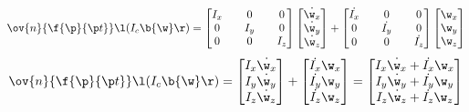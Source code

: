 \documentclass[a4paper, 12pt]{report}
\begin{document}
\begin{center}
$$\ov{n}{\f{\p}{\p t}}\l(I_c \b{\w}\r) = 
\begin{bmatrix}
I_x && 0 && 0 \\
0 && I_y && 0 \\
0 && 0 && I_z
\end{bmatrix}\begin{bmatrix}
\dot{\w_x} \\ \dot{\w_y} \\ \dot{\w_z}
\end{bmatrix}
+ \begin{bmatrix}
\dot{I_x} && 0 && 0 \\
0 && \dot{I_y} && 0 \\
0 && 0 && \dot{I_z}
\end{bmatrix}\begin{bmatrix}
\w_x \\ \w_y \\ \w_z
\end{bmatrix}$$
$$\ov{n}{\f{\p}{\p t}}\l(I_c \b{\w}\r) = 
\begin{bmatrix}
I_x\dot{\w_x} \\
I_y\dot{\w_y} \\
I_z\dot{\w_z}
\end{bmatrix} + \begin{bmatrix}
\dot{I_x}\w_x \\
\dot{I_y}\w_y \\
\dot{I_z}\w_z
\end{bmatrix} = \begin{bmatrix}
I_x\dot{\w_x}+\dot{I_x}\w_x \\
I_y\dot{\w_y}+\dot{I_y}\w_y \\
I_z\dot{\w_z}+\dot{I_z}\w_z
\end{bmatrix}$$


\end{center}
\end{document}
